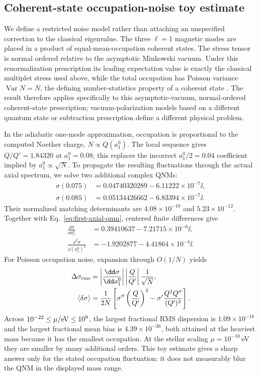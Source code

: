 \subsection{Coherent-state occupation-noise toy estimate}
\label{sec:quantum-extension}

We define a restricted noise model rather than attaching an unspecified correction
to the classical eigenvalue.  The three $\ell=1$ magnetic modes are placed in
a product of equal-mean-occupation coherent states.  The stress tensor is
normal ordered relative to the asymptotic Minkowski vacuum.  Under this
renormalization prescription its leading expectation value is exactly the
classical multiplet stress used above, while the total occupation has Poisson
variance $\operatorname{Var}N=N$, the defining number-statistics property of a
coherent state \cite{Glauber1963}. The result therefore applies specifically
to this asymptotic-vacuum, normal-ordered coherent-state prescription;
vacuum-polarization models based on a different quantum state or subtraction
prescription define a different physical problem.

In the adiabatic one-mode approximation, occupation is proportional to the
computed Noether charge, $N\propto Q(a_1^0)$.  The local sequence gives
$Q/Q'=1.84320$ at $a_1^0=0.08$; this replaces the incorrect
$a_1^0/2=0.04$ coefficient implied by $a_1^0\propto\sqrt N$.  To propagate
the resulting fluctuations through the actual
axial spectrum, we solve two additional complex QNMs:
\begin{align}
\sigma(0.075)&=0.04740320289-6.11222\times10^{-7}\ii,\\
\sigma(0.085)&=0.05134426662-6.83394\times10^{-7}\ii.
\end{align}
Their normalized matching determinants are $4.08\times10^{-10}$ and
$5.23\times10^{-12}$.  Together with Eq.~\eqref{eq:first-axial-qnm}, centered
finite differences give
\begin{align}
\frac{\dd\sigma}{\dd a_1^0}&=0.39410637-7.21715\times10^{-6}\ii,\\
\frac{\dd^2\sigma}{\dd(a_1^0)^2}&=-1.9202877-4.41864\times10^{-4}\ii.
\label{eq:qnm-amplitude-sensitivity}
\end{align}
For Poisson occupation noise, expansion through $O(1/N)$ yields
\begin{align}
\Delta\sigma_{\rm rms}
&=\left|\frac{\dd\sigma}{\dd a_1^0}\right|
\left|\frac{Q}{Q'}\right|\frac{1}{\sqrt N},\label{eq:coherent-qnm-rms}\\
\langle\delta\sigma\rangle
&=\frac{1}{2N}\left[\sigma''\left(\frac{Q}{Q'}\right)^2
-\sigma'\frac{Q^2Q''}{(Q')^3}\right].
\label{eq:coherent-qnm-bias}
\end{align}
Across $10^{-22}\leq\mu/{\rm eV}\leq10^9$, the largest fractional RMS
dispersion is $1.09\times10^{-18}$ and the largest fractional mean bias is
$4.39\times10^{-36}$, both attained at the heaviest mass because it has the
smallest occupation.  At the stellar scaling $\mu=10^{-10}\,$eV they are
smaller by many additional orders.  This toy estimate gives a sharp answer
only for the stated occupation fluctuation: it does not measurably blur the
QNM in the displayed mass range.

